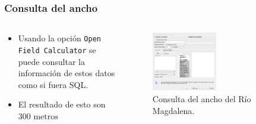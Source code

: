 \documentclass[17pt, t, lualatex]{beamer}
\begin{document}
\begin{frame}
  \frametitle{Consulta del ancho}

  \begin{columns}
    \begin{column}{.3\textwidth}
      \begin{itemize}
        \item Usando la opción \texttt{Open Field Calculator} se puede consultar la información de estos datos como si fuera SQL.
        \item El resultado de esto son $300 \text{ metros}$
      \end{itemize}
    \end{column}

    \begin{column}{.7\textwidth}
      \begin{figure}[ht]
        \centering
        \includegraphics[width=0.5\textwidth]{img/QGIS-7.png}
        \caption{Consulta del ancho del Río Magdalena.}
      \end{figure}
    \end{column}
  \end{columns}

\end{frame}
\end{document}
